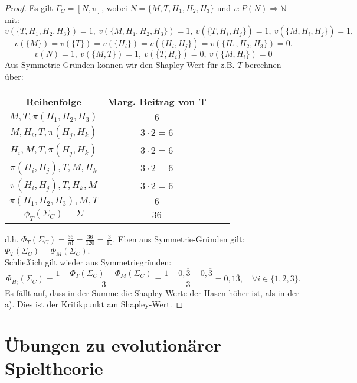\documentclass[12pt]{extreport} %
\newcommand{\N}{\mathbb{N}}
\theoremstyle{named}
\theoremstyle{itshape}
\theoremstyle{normal}
\begin{document}
\begin{enumerate}
 		\begin{proof}
 			Es gilt $\Gamma_C = [N, v]$, wobei $N = \{ M, T, H_{1}, H_{2}, H_{3} \}$ und $v \colon P(N) \Rightarrow \N$ mit:
 			$$ v(\{T, H_{1}, H_{2}, H_{3} \}) = 1, ~ v(\{M, H_{1}, H_{2}, H_{3} \}) = 1,  ~ v(\{T, H_{i}, H_{j} \}) = 1, ~ v(\{M, H_{i}, H_{j} \}) = 1,$$
 			$$  v(\{M\}) = v(\{T\}) = v(\{ H_{i} \}) = v(\{ H_{i}, H_{j} \}) = v(\{ H_{1}, H_{2}, H_{3} \}) = 0. $$
 			$$ v(N) = 1, ~ v(\{M, T\}) = 1, ~v(\{T, H_{i}\}) = 0, ~ v(\{M, H_{i}\}) = 0$$
			Aus Symmetrie-Gründen können wir den Shapley-Wert für z.B. $T$ berechnen über:
  			\begin{center}
    			\begin{tabular}{| c | c | c | c |}
   					\hline
    					Reihenfolge & Marg. Beitrag von T \\ 
    						\hline
    					$M, T, \pi(H_{1}, H_{2}, H_{3})$ & $6$   \\ 
    						\hline
    					$M, H_{i}, T, \pi(H_{j}, H_{k})$ & $3 \cdot 2 = 6$  \\
    						\hline
    					$H_{i}, M, T, \pi(H_{j}, H_{k})$ & $3 \cdot 2 = 6$   \\
       						\hline
    					$\pi(H_{i}, H_{j}), T, M, H_{k}$ & $3 \cdot 2 = 6$   \\
      						\hline
    					$\pi(H_{i}, H_{j}), T, H_{k}, M$ & $3 \cdot 2 = 6$ \\
      						\hline
    					$\pi(H_{1}, H_{2}, H_{3}), M, T$  & $6$ \\
      						\hline \hline
    					$\phi_{T}(\Sigma_{C}) = \Sigma$  & $36$  \\
    				\hline
   				 \end{tabular}
    		\end{center}
    		d.h. $\Phi_{T}(\Sigma_{C}) = \frac{36}{n!} = \frac{36}{120} = \frac{3}{10}$. Eben aus Symmetrie-Gründen gilt: $\Phi_{T}(\Sigma_{C}) = \Phi_{M}(\Sigma_{C})$. \\ 
    		Schließlich gilt wieder aus Symmetriegründen:
    		$$ \Phi_{H_{i}}(\Sigma_{C}) = \frac{1 - \Phi_{T}(\Sigma_{C}) - \Phi_{M}(\Sigma_{C})}{3} = \frac{1 - 0,\overline{3} - 0,\overline{3}}{3} = 0,1\overline{3}, \quad \forall i \in \{1, 2, 3\}. $$
    		Es fällt auf, dass in der Summe die Shapley Werte der Hasen höher ist, als in der a). Dies ist der Kritikpunkt am Shapley-Wert.
 		\end{proof}
  \end{enumerate}

\section{Übungen zu evolutionärer Spieltheorie}
\end{document}
